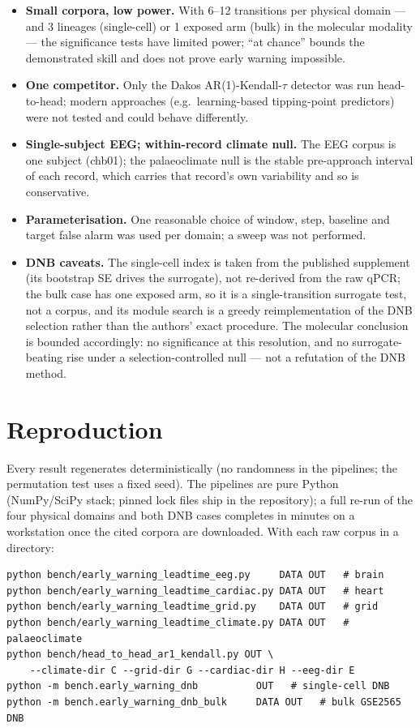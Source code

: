 \documentclass[aip,cha,preprint,amsmath,amssymb]{revtex4-2}
\begin{document}
\begin{itemize}
  \item \textbf{Small corpora, low power.} With 6--12 transitions per
    physical domain --- and 3 lineages (single-cell) or 1 exposed arm
    (bulk) in the molecular modality --- the significance tests have
    limited power; ``at chance'' bounds the demonstrated skill and does
    not prove early warning impossible.
  \item \textbf{One competitor.} Only the Dakos AR(1)-Kendall-$\tau$
    detector was run head-to-head; modern approaches (e.g.\
    learning-based tipping-point predictors) were not tested and could
    behave differently.
  \item \textbf{Single-subject EEG; within-record climate null.} The
    EEG corpus is one subject (chb01); the palaeoclimate null is the
    stable pre-approach interval of each record, which carries that
    record's own variability and so is conservative.
  \item \textbf{Parameterisation.} One reasonable choice of window,
    step, baseline and target false alarm was used per domain; a sweep
    was not performed.
  \item \textbf{DNB caveats.} The single-cell index is taken from the
    published supplement (its bootstrap SE drives the surrogate), not
    re-derived from the raw qPCR; the bulk case has one exposed arm, so
    it is a single-transition surrogate test, not a corpus, and its
    module search is a greedy reimplementation of the DNB selection
    rather than the authors' exact procedure. The molecular conclusion
    is bounded accordingly: no significance at this resolution, and no
    surrogate-beating rise under a selection-controlled null --- not a
    refutation of the DNB method.
\end{itemize}

\section{Reproduction}\label{sec:reproduction}

Every result regenerates deterministically (no randomness in the
pipelines; the permutation test uses a fixed seed). The pipelines are
pure Python (NumPy/SciPy stack; pinned lock files ship in the
repository); a full re-run of the four physical domains and both DNB
cases completes in minutes on a workstation once the cited corpora are
downloaded. With each raw corpus in a directory:

\begin{verbatim}
python bench/early_warning_leadtime_eeg.py     DATA OUT   # brain
python bench/early_warning_leadtime_cardiac.py DATA OUT   # heart
python bench/early_warning_leadtime_grid.py    DATA OUT   # grid
python bench/early_warning_leadtime_climate.py DATA OUT   # palaeoclimate
python bench/head_to_head_ar1_kendall.py OUT \
    --climate-dir C --grid-dir G --cardiac-dir H --eeg-dir E
python -m bench.early_warning_dnb          OUT   # single-cell DNB
python -m bench.early_warning_dnb_bulk     DATA OUT   # bulk GSE2565 DNB
\end{verbatim}
\end{document}
